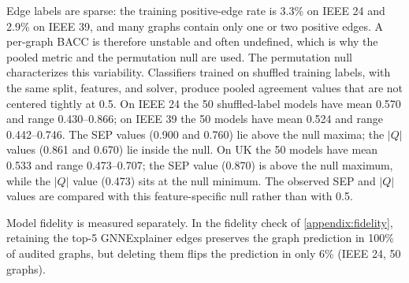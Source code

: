 Edge labels are sparse: the training positive-edge rate is 3.3\% on IEEE 24 and 2.9\% on IEEE 39, and many graphs contain only one or two positive edges. A per-graph BACC is therefore unstable and often undefined, which is why the pooled metric and the permutation null are used. The permutation null characterizes this variability. Classifiers trained on shuffled training labels, with the same split, features, and solver, produce pooled agreement values that are not centered tightly at 0.5. On IEEE 24 the 50 shuffled-label models have mean 0.570 and range 0.430--0.866; on IEEE 39 the 50 models have mean 0.524 and range 0.442--0.746. The SEP values (0.900 and 0.760) lie above the null maxima; the $|Q|$ values (0.861 and 0.670) lie inside the null. On UK the 50 models have mean 0.533 and range 0.473--0.707; the SEP value (0.870) is above the null maximum, while the $|Q|$ value (0.473) sits at the null minimum. The observed SEP and $|Q|$ values are compared with this feature-specific null rather than with 0.5.

Model fidelity is measured separately. In the fidelity check of \ref{appendix:fidelity}, retaining the top-5 GNNExplainer edges preserves the graph prediction in 100\% of audited graphs, but deleting them flips the prediction in only 6\% (IEEE 24, 50 graphs).

